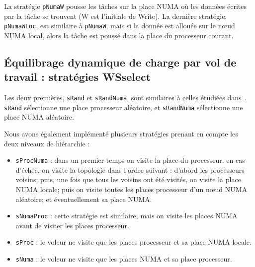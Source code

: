 \documentclass[parallelisme]{compas2016}
\begin{document}
La stratégie \verb/pNumaW/ pousse les tâches sur la place NUMA où les données
écrites par la tâche se trouvent (W est l'initiale de Write).
La dernière stratégie, \verb/pNumaWLoc/, est similaire à \verb/pNumaW/, mais
si la donnée est allouée sur le nœud NUMA local, alors la tâche est poussé dans
la place du processeur courant.


\vspace*{-1ex}
\subsection{Équilibrage dynamique de charge par vol de travail : stratégies WSselect}

Les deux premières, \verb/sRand/ et \verb/sRandNuma/, sont similaires à celles étudiées
dans~\cite{DBLP:journals/ijhpca/OlivierPWSP12}. \verb/sRand/ sélectionne une place
processeur aléatoire, et \verb/sRandNuma/ sélectionne une place NUMA aléatoire.

Nous avons également implémenté plusieurs stratégies prenant en compte les deux niveaux
de hiérarchie :

\begin{itemize}
  \item \verb/sProcNuma/ : dans un premier temps on visite la place du processeur.
    en cas d'échec, on visite la topologie dans l'ordre suivant : d'abord les
    processeurs voisins; puis, une fois que tous les voisins ont été visités, on
    visite la place NUMA locale; puis on visite toutes les places processeur d'un
    nœud NUMA aléatoire; et éventuellement sa place NUMA.
    
  \item \verb/sNumaProc/ : cette stratégie est similaire, mais on visite les places
    NUMA avant de visiter les places processeur.
  \item \verb/sProc/ : le voleur ne visite que les places processeur et sa place
    NUMA locale.
  \item \verb/sNuma/ : le voleur ne visite que les places NUMA et sa place processeur.
\end{itemize}



\vspace*{-1ex}
\end{document}
